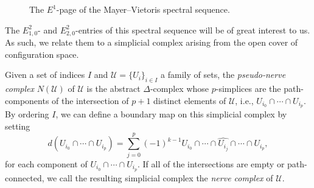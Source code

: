 \documentclass[pagebackref,colorlinks,citecolor=blue,linkcolor=blue,urlcolor=blue,filecolor=blue]{article}
\theoremstyle{definition}\newtheorem{definition}[thm]{Definition}
\theoremstyle{definition}
\begin{document}
\begin{figure}[h]
\centering
{}
\caption{The $E^{1}$-page of the Mayer--Vietoris spectral sequence.}
\label{MayerVietoris}
\end{figure}

The $E^{2}_{1,0}$- and $E^{2}_{2,0}$-entries of this spectral sequence will be of great interest to us.
As such, we relate them to a simplicial complex arising from the open cover of configuration space.

Given a set of indices $I$ and $\mathcal{U}=\{U_{i}\}_{i\in I}$ a family of sets, the \emph{pseudo-nerve complex} $N(\mathcal{U})$ of $\mathcal{U}$ is the abstract $\Delta$-complex whose $p$-simplices are the path-components of the intersection of $p+1$ distinct elements of $\mathcal{U}$, i.e., $U_{i_{0}}\cap \cdots\cap U_{i_{p}}$.
By ordering $I$, we can define a boundary map on this simplicial complex by setting
\[
d(U_{i_{0}}\cap \cdots\cap U_{i_{p}})=\sum_{j=0}^{p}(-1)^{k-1}U_{i_{0}}\cap\cdots\cap \widehat{U_{i_{j}}}\cap\cdots\cap U_{i_{p}},
\]
for each component of $U_{i_{0}}\cap \cdots\cap U_{i_{p}}$.
If all of the intersections are empty or path-connected, we call the resulting simplicial complex the \emph{nerve complex} of $\mathcal{U}$.
\end{document}
